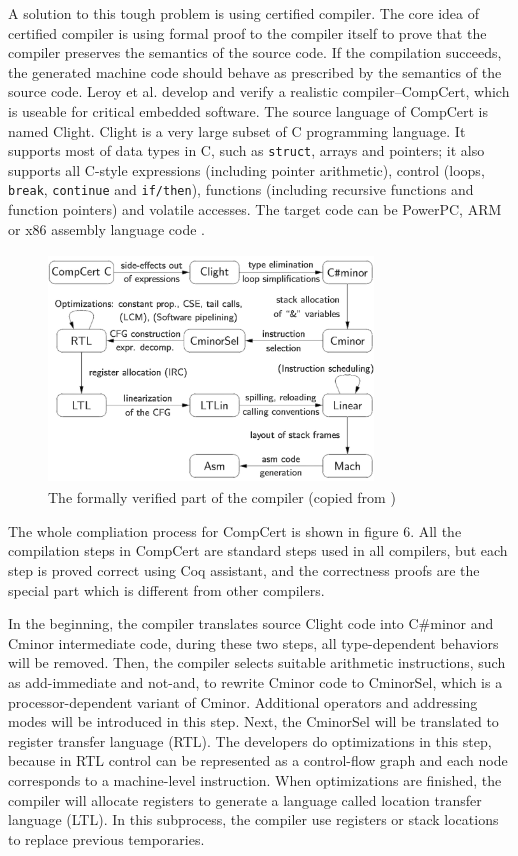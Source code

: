 \documentclass[10pt, conference, compsocconf]{IEEEtran}
\begin{document}
A solution to this tough problem is using certified compiler. The core idea of certified compiler is using formal proof to the compiler itself to prove that the compiler preserves the semantics of the source code. If the compilation succeeds, the generated machine code should behave as prescribed by the semantics of the source code. Leroy et al. develop and verify a realistic compiler--CompCert, which is useable for critical embedded software. The source language of CompCert is named Clight. Clight is a very large subset of C programming language. It supports most of data types in C, such as \texttt{struct}, arrays and pointers; it also supports all C-style expressions (including pointer arithmetic), control (loops, \texttt{break}, \texttt{continue} and \texttt{if/then}), functions (including recursive functions and function pointers) and volatile accesses. The target code can be PowerPC, ARM or x86 assembly language code \cite{CompCert}.


	\begin{figure}[H]
	\centering
	\includegraphics[height=2.4in ,width=3.4in]{compiler.png}
	\caption{The formally verified part of the compiler (copied from \cite{compiler})}
	\end{figure}

The whole compliation process for CompCert is shown in figure 6. All the compilation steps in CompCert are standard steps used in all compilers, but each step is proved correct using Coq assistant, and the correctness proofs are the special part which is different from other compilers.

In the beginning, the compiler translates source Clight code into C\#minor and Cminor intermediate code, during these two steps, all type-dependent behaviors will be removed. Then, the compiler selects suitable arithmetic instructions, such as add-immediate and not-and, to rewrite Cminor code to CminorSel, which is a processor-dependent variant of Cminor. Additional operators and addressing modes will be introduced in this step. Next, the CminorSel will be translated to register transfer language (RTL). The developers do optimizations in this step, because in RTL control can be represented as a control-flow graph and each node corresponds to a machine-level instruction. When optimizations are finished, the compiler will allocate registers to generate a language called location transfer language (LTL). In this subprocess, the compiler use registers or stack locations to replace previous temporaries.
\end{document}
